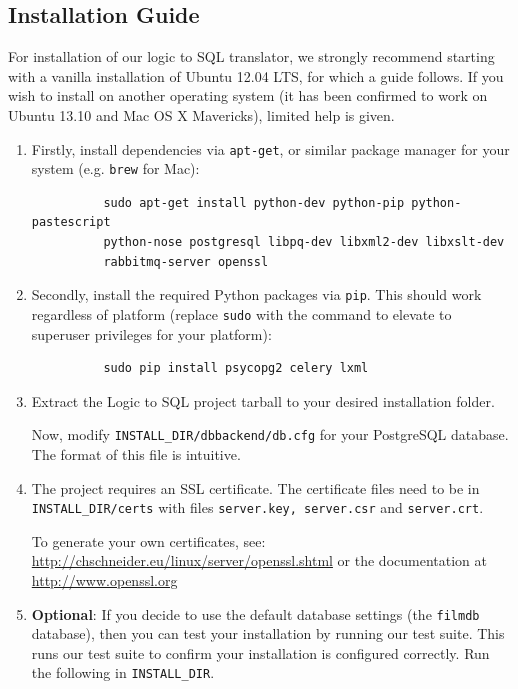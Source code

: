 \documentclass[a4paper, 11pt]{article}
\begin{document}
  \subsection{Installation Guide}
    For installation of our logic to SQL translator, we strongly recommend
    starting with a vanilla installation of Ubuntu 12.04 LTS, for which a guide
    follows. If you wish to install on another operating system (it has been 
    confirmed to work on Ubuntu 13.10 and Mac OS X Mavericks),
    limited help is given.

    \begin{enumerate}
      \item Firstly, install dependencies via \texttt{apt-get}, or similar
        package manager for your system (e.g. \texttt{brew} for Mac):
        \begin{verbatim}
          sudo apt-get install python-dev python-pip python-pastescript
          python-nose postgresql libpq-dev libxml2-dev libxslt-dev
          rabbitmq-server openssl
        \end{verbatim}

      \item Secondly, install the required Python packages via \texttt{pip}.
        This should work regardless of platform (replace \texttt{sudo} with the
        command to elevate to superuser privileges for your platform):
        \begin{verbatim}
          sudo pip install psycopg2 celery lxml
        \end{verbatim}

      \item Extract the Logic to SQL project tarball to your desired
        installation folder.

        Now, modify \texttt{INSTALL\_DIR/dbbackend/db.cfg} for your PostgreSQL
        database. The format of this file is intuitive.

      \item The project requires an SSL certificate. The certificate
        files need to be in \texttt{INSTALL\_DIR/certs} with files
        \texttt{server.key, server.csr} and \texttt{server.crt}.

        To generate your own certificates, see:\\
        \url{http://chschneider.eu/linux/server/openssl.shtml} or the
        documentation at \url{http://www.openssl.org}

      \item \textbf{Optional}: If you decide to use
        the default database settings (the \texttt{filmdb} database), then you
        can test your installation by running our test suite. This runs
        our test suite to confirm your installation is configured correctly.
        Run the following in \texttt{INSTALL\_DIR}.


\end{enumerate}
\end{document}
